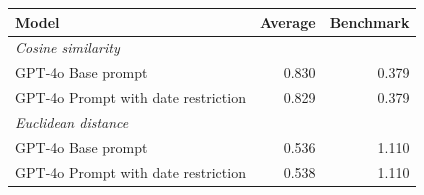 
\begin{tabular}{lrr}
\toprule
Model & Average & Benchmark\\
\midrule
\multicolumn{3}{l}{\textit{Cosine similarity}}\\
\hspace{1em}GPT-4o Base prompt & 0.830 & 0.379\\
\hspace{1em}GPT-4o Prompt with date restriction & 0.829 & 0.379\\
\midrule
\multicolumn{3}{l}{\textit{Euclidean distance}}\\
\hspace{1em}GPT-4o Base prompt & 0.536 & 1.110\\
\hspace{1em}GPT-4o Prompt with date restriction & 0.538 & 1.110\\
\bottomrule
\end{tabular}
